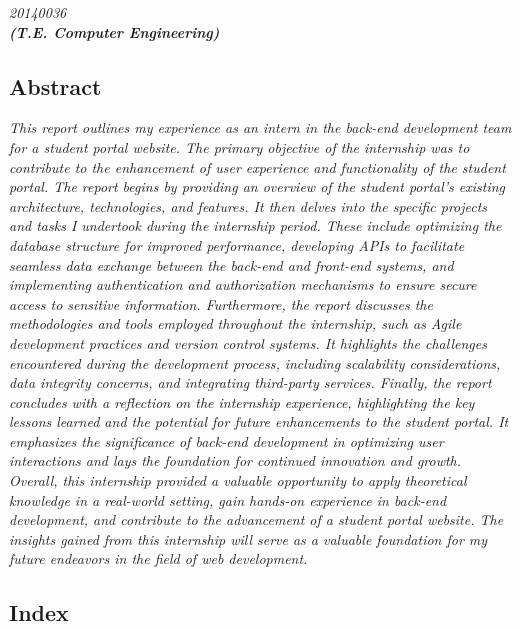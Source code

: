 \documentclass[12pt]{article}
\begin{document}
{\hfill\emph{20140036}}\\
\medskip
{\hfill\emph{\textbf{(T.E. Computer Engineering)}}}\\
\pagebreak
\begin{center}
	\section*{Abstract}
\end{center}
\medskip
\emph{\hspace{1cm}This report outlines my experience as an intern in the back-end development team for a student portal website. The primary objective of the internship was to contribute to the enhancement of user experience and functionality of the student portal. The report begins by providing an overview of the student portal's existing architecture, technologies, and features. It then delves into the specific projects and tasks I undertook during the internship period. These include optimizing the database structure for improved performance, developing APIs to facilitate seamless data exchange between the back-end and front-end systems, and implementing authentication and authorization mechanisms to ensure secure access to sensitive information. Furthermore, the report discusses the methodologies and tools employed throughout the internship, such as Agile development practices and version control systems. It highlights the challenges encountered during the development process, including scalability considerations, data integrity concerns, and integrating third-party services. Finally, the report concludes with a reflection on the internship experience, highlighting the key lessons learned and the potential for future enhancements to the student portal. It emphasizes the significance of back-end development in optimizing user interactions and lays the foundation for continued innovation and growth. Overall, this internship provided a valuable opportunity to apply theoretical knowledge in a real-world setting, gain hands-on experience in back-end development, and contribute to the advancement of a student portal website. The insights gained from this internship will serve as a valuable foundation for my future endeavors in the field of web development.}
\pagebreak
\newpage
\begin{center}
    \section*{Index}
\end{center}
\end{document}
